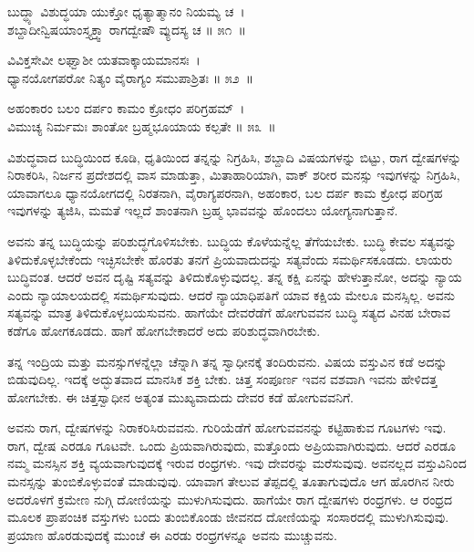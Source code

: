 \begin{shloka}
ಬುದ್ಧ್ಯಾ ವಿಶುದ್ಧಯಾ ಯುಕ್ತೋ ಧೃತ್ಯಾತ್ಮಾನಂ ನಿಯಮ್ಯ ಚ~। \\ಶಬ್ದಾದೀನ್ವಿಷಯಾಂಸ್ತ್ಯಕ್ತ್ವಾ ರಾಗದ್ವೇಷೌ ವ್ಯುದಸ್ಯ ಚ \hfill॥ ೫೧~॥
\end{shloka}

\begin{shloka}
ವಿವಿಕ್ತಸೇವೀ ಲಘ್ವಾಶೀ ಯತವಾಕ್ಕಾಯಮಾನಸಃ~।\\ಧ್ಯಾನಯೋಗಪರೋ ನಿತ್ಯಂ ವೈರಾಗ್ಯಂ ಸಮುಪಾಶ್ರಿತಃ \hfill॥ ೫೨~॥
\end{shloka}

\begin{shloka}
ಅಹಂಕಾರಂ ಬಲಂ ದರ್ಪಂ ಕಾಮಂ ಕ್ರೋಧಂ ಪರಿಗ್ರಹಮ್~।\\ವಿಮುಚ್ಯ ನಿರ್ಮಮಃ ಶಾಂತೋ ಬ್ರಹ್ಮಭೂಯಾಯ ಕಲ್ಪತೇ \hfill॥ ೫೩~॥
\end{shloka}

\begin{artha}
ವಿಶುದ್ಧವಾದ ಬುದ್ಧಿಯಿಂದ ಕೂಡಿ, ಧೃತಿಯಿಂದ ತನ್ನನ್ನು ನಿಗ್ರಹಿಸಿ, ಶಬ್ದಾದಿ ವಿಷಯಗಳನ್ನು ಬಿಟ್ಟು, ರಾಗ ದ್ವೇಷಗಳನ್ನು ನಿರಾಕರಿಸಿ, ನಿರ್ಜನ ಪ್ರದೇಶದಲ್ಲಿ ವಾಸ ಮಾಡುತ್ತಾ, ಮಿತಾಹಾರಿಯಾಗಿ, ವಾಕ್ ಶರೀರ ಮನಸ್ಸು ಇವುಗಳನ್ನು ನಿಗ್ರಹಿಸಿ, ಯಾವಾಗಲೂ ಧ್ಯಾನಯೋಗದಲ್ಲಿ ನಿರತನಾಗಿ, ವೈರಾಗ್ಯಪರನಾಗಿ, ಅಹಂಕಾರ, ಬಲ ದರ್ಪ ಕಾಮ ಕ್ರೋಧ ಪರಿಗ್ರಹ ಇವುಗಳನ್ನು ತ್ಯಜಿಸಿ, ಮಮತೆ ಇಲ್ಲದೆ ಶಾಂತನಾಗಿ ಬ್ರಹ್ಮ ಭಾವವನ್ನು ಹೊಂದಲು ಯೋಗ್ಯನಾಗುತ್ತಾನೆ.
\end{artha}

ಅವನು ತನ್ನ ಬುದ್ಧಿಯನ್ನು ಪರಿಶುದ್ಧಗೊಳಿಸಬೇಕು. ಬುದ್ಧಿಯ ಕೊಳೆಯನ್ನೆಲ್ಲ ತೆಗೆಯಬೇಕು. ಬುದ್ಧಿ ಕೇವಲ ಸತ್ಯವನ್ನು ತಿಳಿದುಕೊಳ್ಳಬೇಕೆಂದು ಇಚ್ಛಿಸಬೇಕೇ ಹೊರತು ತನಗೆ ಪ್ರಿಯವಾದುದನ್ನು ಸತ್ಯವೆಂದು ಸಮರ್ಥಿಸಕೂಡದು. ಲಾಯರು ಬುದ್ಧಿವಂತ. ಆದರೆ ಅವನ ದೃಷ್ಟಿ ಸತ್ಯವನ್ನು ತಿಳಿದುಕೊಳ್ಳುವುದಲ್ಲ. ತನ್ನ ಕಕ್ಷಿ ಏನನ್ನು ಹೇಳುತ್ತಾನೋ, ಅದನ್ನು ನ್ಯಾಯ ಎಂದು ನ್ಯಾಯಾಲಯದಲ್ಲಿ ಸಮರ್ಥಿಸುವುದು. ಆದರೆ ನ್ಯಾಯಾಧಿಪತಿಗೆ ಯಾವ ಕಕ್ಷಿಯ ಮೇಲೂ ಮನಸ್ಸಿಲ್ಲ. ಅವನು ಸತ್ಯವನ್ನು ಮಾತ್ರ ತಿಳಿದುಕೊಳ್ಳಬಯಸುವನು. ಹಾಗೆಯೇ ದೇವರೆಡೆಗೆ ಹೋಗುವವನ ಬುದ್ಧಿ ಸತ್ಯದ ವಿನಹ ಬೇರಾವ ಕಡೆಗೂ ಹೋಗಕೂಡದು. ಹಾಗೆ ಹೋಗಬೇಕಾದರೆ ಅದು ಪರಿಶುದ್ಧವಾಗಿರಬೇಕು.

ತನ್ನ ಇಂದ್ರಿಯ ಮತ್ತು ಮನಸ್ಸುಗಳನ್ನೆಲ್ಲಾ ಚೆನ್ನಾಗಿ ತನ್ನ ಸ್ವಾಧೀನಕ್ಕೆ ತಂದಿರುವನು. ವಿಷಯ ವಸ್ತುವಿನ ಕಡೆ ಅದನ್ನು ಬಿಡುವುದಿಲ್ಲ. ಇದಕ್ಕೆ ಅದ್ಭುತವಾದ ಮಾನಸಿಕ ಶಕ್ತಿ ಬೇಕು. ಚಿತ್ತ ಸಂಪೂರ್ಣ ಇವನ ವಶವಾಗಿ ಇವನು ಹೇಳಿದತ್ತ ಹೋಗಬೇಕು. ಈ ಚಿತ್ತಸ್ವಾಧೀನ ಅತ್ಯಂತ ಮುಖ್ಯವಾದುದು ದೇವರ ಕಡೆ ಹೋಗುವವನಿಗೆ.

ಅವನು ರಾಗ, ದ್ವೇಷಗಳನ್ನು ನಿರಾಕರಿಸಿರುವವನು. ಗುರಿಯೆಡೆಗೆ ಹೋಗುವವನನ್ನು ಕಟ್ಟಿಹಾಕುವ ಗೂಟಗಳು ಇವು. ರಾಗ, ದ್ವೇಷ ಎರಡೂ ಗೂಟವೇ. ಒಂದು ಪ್ರಿಯವಾಗಿರುವುದು, ಮತ್ತೊಂದು ಅಪ್ರಿಯವಾಗಿರುವುದು. ಆದರೆ ಎರಡೂ ನಮ್ಮ ಮನಸ್ಸಿನ ಶಕ್ತಿ ವ್ಯಯವಾಗುವುದಕ್ಕೆ ಇರುವ ರಂಧ್ರಗಳು. ಇವು ದೇವರನ್ನು ಮರೆಸುವುವು. ಅವನಲ್ಲದ ವಸ್ತುವಿನಿಂದ ಮನಸ್ಸನ್ನು ತುಂಬಿಕೊಳ್ಳುವಂತೆ ಮಾಡುವುವು. ಯಾವಾಗ ತೇಲುವ ತೆಪ್ಪದಲ್ಲಿ ತೂತಾಗುವುದೊ ಆಗ ಹೊರಗಿನ ನೀರು ಅದರೊಳಗೆ ಕ್ರಮೇಣ ನುಗ್ಗಿ ದೋಣಿಯನ್ನು ಮುಳುಗಿಸುವುದು. ಹಾಗೆಯೇ ರಾಗ ದ್ವೇಷಗಳು ರಂಧ್ರಗಳು. ಆ ರಂಧ್ರದ ಮೂಲಕ ಪ್ರಾಪಂಚಿಕ ವಸ್ತುಗಳು ಬಂದು ತುಂಬಿಕೊಂಡು ಜೀವನದ ದೋಣಿಯನ್ನು ಸಂಸಾರದಲ್ಲಿ ಮುಳುಗಿಸುವುವು. ಪ್ರಯಾಣ ಹೊರಡುವುದಕ್ಕೆ ಮುಂಚೆ ಈ ಎರಡು ರಂಧ್ರಗಳನ್ನೂ ಅವನು ಮುಚ್ಚುವನು.


